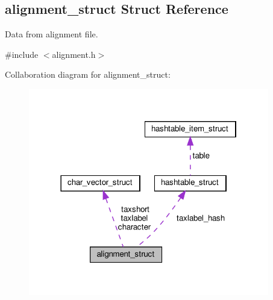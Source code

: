 \hypertarget{structalignment__struct}{}\subsection{alignment\+\_\+struct Struct Reference}
\label{structalignment__struct}


Data from alignment file.  




{\ttfamily \#include $<$alignment.\+h$>$}



Collaboration diagram for alignment\+\_\+struct\+:\nopagebreak
\begin{figure}[H]
\begin{center}
\leavevmode
\includegraphics[width=298pt]{structalignment__struct__coll__graph}
\end{center}
\end{figure}
